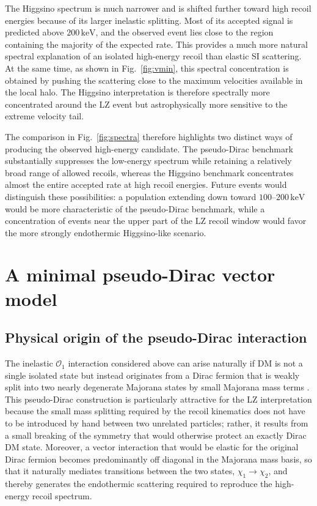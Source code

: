 \documentclass[aps,prd,reprint,superscriptaddress,nofootinbib,longbibliography,floatfix]{revtex4-2}
\newcommand{\keV}{\mathrm{keV}}
\begin{document}
The Higgsino spectrum is much narrower and is shifted further toward high recoil energies because of its larger inelastic splitting. Most of its accepted signal is predicted above $200\,\keV$, and the observed event lies close to the region containing the majority of the expected rate. This provides a much more natural spectral explanation of an isolated high-energy recoil than elastic SI scattering. At the same time, as shown in Fig.~\ref{fig:vmin}, this spectral concentration is obtained by pushing the scattering close to the maximum velocities available in the local halo. The Higgsino interpretation is therefore spectrally more concentrated around the LZ event but astrophysically more sensitive to the extreme velocity tail.

The comparison in Fig.~\ref{fig:spectra} therefore highlights two distinct ways of producing the observed high-energy candidate. The pseudo-Dirac benchmark substantially suppresses the low-energy spectrum while retaining a relatively broad range of allowed recoils, whereas the Higgsino benchmark concentrates almost the entire accepted rate at high recoil energies. Future events would distinguish these possibilities: a population extending down toward $100$--$200\,\keV$ would be more characteristic of the pseudo-Dirac benchmark, while a concentration of events near the upper part of the LZ recoil window would favor the more strongly endothermic Higgsino-like scenario.



\section{A minimal pseudo-Dirac vector model}
\label{sec:minpseudo}

\subsection{Physical origin of the pseudo-Dirac interaction}
\label{sec:pseudodiracorigin}

The inelastic $\mathcal{O}_1$ interaction considered above can arise naturally if DM is not a single isolated state but instead originates from a Dirac fermion that is weakly split into two nearly degenerate Majorana states by small Majorana mass terms \cite{TuckerSmith2001,DeSimone2010}. This pseudo-Dirac construction is particularly attractive for the LZ interpretation because the small mass splitting required by the recoil kinematics does not have to be introduced by hand between two unrelated particles; rather, it results from a small breaking of the symmetry that would otherwise protect an exactly Dirac DM state. Moreover, a vector interaction that would be elastic for the original Dirac fermion becomes predominantly off diagonal in the Majorana mass basis, so that it naturally mediates transitions between the two states, $\chi_1\rightarrow\chi_2$, and thereby generates the endothermic scattering required to reproduce the high-energy recoil spectrum.
\end{document}
